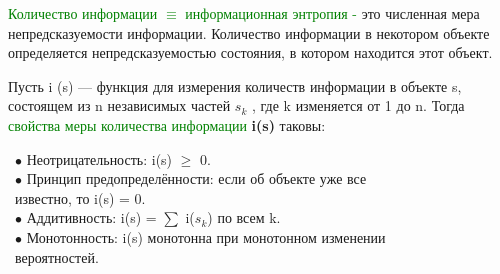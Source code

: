 \newpage
\rhead{\textbf{\textcolor{blue}{И}\textcolor{gray}{змерение количества информации}}}
\vspace*{2mm}
\newline
\textcolor{Green}{Количество информации $\equiv$ информационная энтропия -} это численная мера непредсказуемости информации. Количество информации в некотором объекте определяется непредсказуемостью состояния, в котором находится этот объект.
\vspace*{2mm}

Пусть i (s) — функция для измерения количеств информации в объекте s, состоящем из n
независимых частей $s_k$
, где k изменяется от 1 до n. Тогда \textcolor{Green}{свойства меры количества
информации} \textbf{i(s)} таковы:
\newline

\ $\bullet$ \quad Неотрицательность: i(s) $\geq$ 0.\\
\ $\bullet$ \quad Принцип предопределённости: если об объекте уже все\\
\ \quad \quad   известно, то i(s) = 0.\\
\ $\bullet$  \quad Аддитивность: i(s) = $\sum$ i($s_k$) по всем k.\\
\ $\bullet$  \quad Монотонность: i(s) монотонна при монотонном изменении \\
\ \quad \quad  вероятностей.\\




